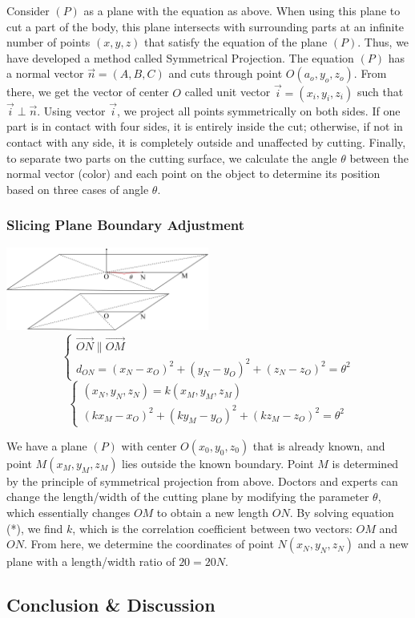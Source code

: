 \documentclass{article}
\begin{document}
\begin{multicols}{2}
Consider $(P)$ as a plane with the equation as above. When using this plane to cut a part of the body, this plane intersects with surrounding parts at an infinite number of points $(x, y, z)$ that satisfy the equation of the plane $(P)$. Thus, we have developed a method called Symmetrical Projection. The equation $(P)$ has a normal vector $\vec{n}=(A, B, C)$ and cuts through point $O(a_o, y_o, z_o)$. From there, we get the vector of center $O$ called unit vector $\vec{i} = (x_i, y_i, z_i)$ such that $\vec{i} \perp \vec{n}$. Using vector $\vec{i}$, we project all points symmetrically on both sides. If one part is in contact with four sides, it is entirely inside the cut; otherwise, if not in contact with any side, it is completely outside and unaffected by cutting. Finally, to separate two parts on the cutting surface, we calculate the angle $\theta$ between the normal vector (color) and each point on the object to determine its position based on three cases of angle $\theta$.

\subsubsection{Slicing Plane Boundary Adjustment}
\includegraphics[width=0.5\textwidth]{figures/plane.png} \\

$$
\left\{ 
    \begin{array}{ll}
        \vec{ON} \parallel \vec{OM} \\
        d_{ON} = (x_N - x_O)^2 + (y_N - y_O)^2 + (z_N - z_O)^2 = \theta^2
    \end{array}
\right.   
$$
$$
\left\{ 
    \begin{array}{ll}
        (x_N, y_N, z_N) = k(x_M, y_M, z_M) \\
        (kx_M - x_O)^2 + (ky_M - y_O)^2 + (kz_M - z_O)^2 = \theta^2
    \end{array}
\right. 
$$

We have a plane $(P)$ with center $O(x_0, y_0, z_0)$ that is already known, and point $M(x_M, y_M, z_M)$ lies outside the known boundary. Point $M$ is determined by the principle of symmetrical projection from above. Doctors and experts can change the length/width of the cutting plane by modifying the parameter $\theta$, which essentially changes $OM$ to obtain a new length $ON$. By solving equation (*), we find $k$, which is the correlation coefficient between two vectors: $OM$ and $ON$. From here, we determine the coordinates of point $N(x_N, y_N, z_N)$ and a new plane with a length/width ratio of $20 = 20N$.

\subsection{Conclusion \& Discussion}




\newpage


\end{multicols}
\end{document}
